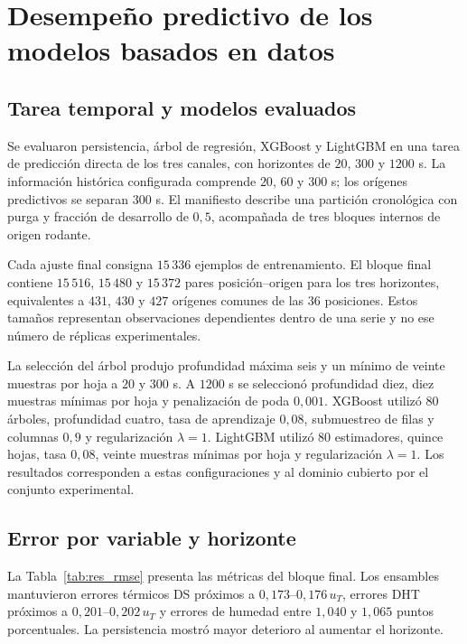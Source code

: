 \FloatBarrier

\section{Desempeño predictivo de los modelos basados en datos}
\label{res:aprendizaje}

\subsection{Tarea temporal y modelos evaluados}

Se evaluaron persistencia, árbol de regresión, XGBoost y LightGBM en una tarea de predicción directa de los tres canales, con horizontes de $20$, $300$ y $1200$ s. La información histórica configurada comprende $20$, $60$ y $300$ s; los orígenes predictivos se separan $300$ s. El manifiesto describe una partición cronológica con purga y fracción de desarrollo de $0{,}5$, acompañada de tres bloques internos de origen rodante.

Cada ajuste final consigna $15\,336$ ejemplos de entrenamiento. El bloque final contiene $15\,516$, $15\,480$ y $15\,372$ pares posición--origen para los tres horizontes, equivalentes a $431$, $430$ y $427$ orígenes comunes de las $36$ posiciones. Estos tamaños representan observaciones dependientes dentro de una serie y no ese número de réplicas experimentales.

La selección del árbol produjo profundidad máxima seis y un mínimo de veinte muestras por hoja a $20$ y $300$ s. A $1200$ s se seleccionó profundidad diez, diez muestras mínimas por hoja y penalización de poda $0{,}001$. XGBoost utilizó $80$ árboles, profundidad cuatro, tasa de aprendizaje $0{,}08$, submuestreo de filas y columnas $0{,}9$ y regularización $\lambda=1$. LightGBM utilizó $80$ estimadores, quince hojas, tasa $0{,}08$, veinte muestras mínimas por hoja y regularización $\lambda=1$. Los resultados corresponden a estas configuraciones y al dominio cubierto por el conjunto experimental.

\subsection{Error por variable y horizonte}

La Tabla~\ref{tab:res_rmse} presenta las métricas del bloque final. Los ensambles mantuvieron errores térmicos DS próximos a $0{,}173$--$0{,}176\,u_T$, errores DHT próximos a $0{,}201$--$0{,}202\,u_T$ y errores de humedad entre $1{,}040$ y $1{,}065$ puntos porcentuales. La persistencia mostró mayor deterioro al aumentar el horizonte.

